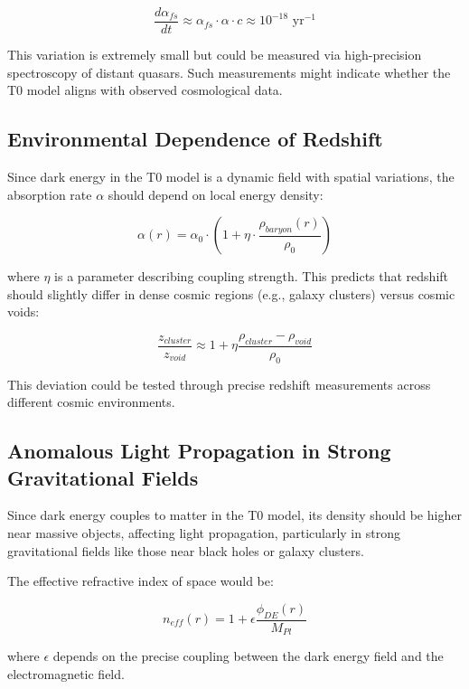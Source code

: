 \documentclass[a4paper,12pt]{article}
\theoremstyle{definition}
\theoremstyle{remark}
\begin{document}
	\begin{equation}
		\frac{d\alpha_{fs}}{dt} \approx \alpha_{fs} \cdot \alpha \cdot c \approx 10^{-18} \text{ yr}^{-1}
	\end{equation}
	
	This variation is extremely small but could be measured via high-precision spectroscopy of distant quasars. Such measurements might indicate whether the T0 model aligns with observed cosmological data.
	
	\subsection{Environmental Dependence of Redshift}
	Since dark energy in the T0 model is a dynamic field with spatial variations, the absorption rate $\alpha$ should depend on local energy density:
	
	\begin{equation}
		\alpha(r) = \alpha_0 \cdot \left(1 + \eta \cdot \frac{\rho_{baryon}(r)}{\rho_0}\right)
	\end{equation}
	
	where $\eta$ is a parameter describing coupling strength. This predicts that redshift should slightly differ in dense cosmic regions (e.g., galaxy clusters) versus cosmic voids:
	
	\begin{equation}
		\frac{z_{cluster}}{z_{void}} \approx 1 + \eta\frac{\rho_{cluster} - \rho_{void}}{\rho_0}
	\end{equation}
	
	This deviation could be tested through precise redshift measurements across different cosmic environments.
	
	\subsection{Anomalous Light Propagation in Strong Gravitational Fields}
	Since dark energy couples to matter in the T0 model, its density should be higher near massive objects, affecting light propagation, particularly in strong gravitational fields like those near black holes or galaxy clusters.
	
	The effective refractive index of space would be:
	
	\begin{equation}
		n_{eff}(r) = 1 + \epsilon \frac{\phi_{DE}(r)}{M_{Pl}}
	\end{equation}
	
	where $\epsilon$ depends on the precise coupling between the dark energy field and the electromagnetic field.
	
\end{document}
